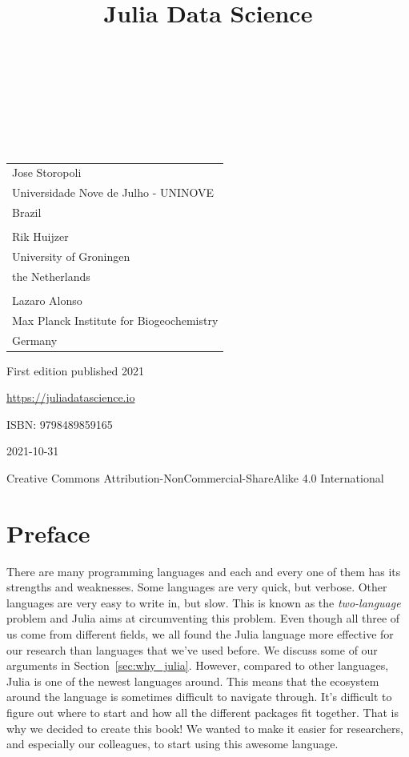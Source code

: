 \documentclass[
  notoc %
]{tufte-book}
\title{Julia Data Science}
\author{\noindent{Jose Storopoli}\\[3mm] \noindent{Rik
Huijzer}\\[3mm] \noindent{Lazaro Alonso}\\[3mm] }
\date{}
\begin{document}
\makeatletter
\thispagestyle{empty}
\vfill
{\Huge\bf
\noindent
\@title
}\\[1in]
{\Large
\noindent
\@author
}
\makeatother

\makeatletter
\newpage
\thispagestyle{empty}
\vfill
{\noindent
\begin{tabular}{l} Jose Storopoli\\ Universidade Nove de Julho - UNINOVE\\ Brazil\\ \\ Rik Huijzer\\ University of Groningen\\ the Netherlands\\ \\ Lazaro Alonso\\ Max Planck Institute for Biogeochemistry\\ Germany \end{tabular}
}
\vfill
{\small
First edition published 2021

\url{https://juliadatascience.io}

ISBN: 9798489859165

2021-10-31

Creative Commons Attribution-NonCommercial-ShareAlike 4.0 International
}
\makeatother


\frontmatter
\mainmatter

\setcounter{tocdepth}{1}
\tableofcontents

\justifying

\setlength{\parindent}{0pt}

\hypertarget{sec:preface}{%
\chapter{Preface}\label{sec:preface}}

There are many programming languages and each and every one of them has
its strengths and weaknesses. Some languages are very quick, but
verbose. Other languages are very easy to write in, but slow. This is
known as the \emph{two-language} problem and Julia aims at circumventing
this problem. Even though all three of us come from different fields, we
all found the Julia language more effective for our research than
languages that we've used before. We discuss some of our arguments in
Section~\ref{sec:why_julia}. However, compared to other languages, Julia
is one of the newest languages around. This means that the ecosystem
around the language is sometimes difficult to navigate through. It's
difficult to figure out where to start and how all the different
packages fit together. That is why we decided to create this book! We
wanted to make it easier for researchers, and especially our colleagues,
to start using this awesome language.
\end{document}
